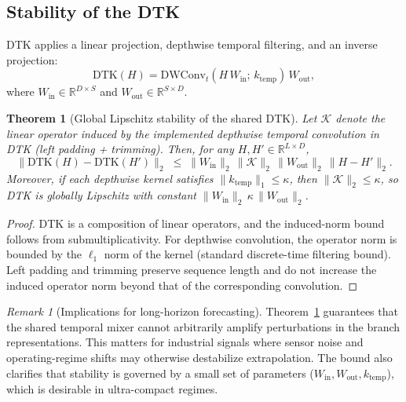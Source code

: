 \documentclass[journal]{IEEEtran}
\newtheorem{theorem}{Theorem}
\theoremstyle{remark}
\newtheorem{remark}{Remark}
\begin{document}
\subsection{Stability of the DTK}
DTK applies a linear projection, depthwise temporal filtering, and an
inverse projection:
\begin{equation}
\label{eq:dtk}
\mathrm{DTK}(H) = \mathrm{DWConv}_t(H\, W_{\mathrm{in}};\, k_{\mathrm{temp}})\,
                  W_{\mathrm{out}},
\end{equation}
where $W_{\mathrm{in}} \in \mathbb{R}^{D \times S}$ and
$W_{\mathrm{out}} \in \mathbb{R}^{S \times D}$.

\begin{theorem}[Global Lipschitz stability of the shared DTK]
\label{thm:dtk-lipschitz}
Let $\mathcal{K}$ denote the linear operator induced by the implemented
depthwise temporal convolution in DTK (left padding + trimming). Then,
for any $H, H' \in \mathbb{R}^{L \times D}$,
\begin{equation*}
\|\mathrm{DTK}(H) - \mathrm{DTK}(H')\|_2 \;\le\;
  \|W_{\mathrm{in}}\|_2 \, \|\mathcal{K}\|_2 \, \|W_{\mathrm{out}}\|_2 \,
  \|H - H'\|_2.
\end{equation*}
Moreover, if each depthwise kernel satisfies
$\|k_{\mathrm{temp}}\|_1 \le \kappa$, then
$\|\mathcal{K}\|_2 \le \kappa$, so DTK is globally Lipschitz with
constant $\|W_{\mathrm{in}}\|_2\, \kappa\, \|W_{\mathrm{out}}\|_2$.
\end{theorem}

\begin{proof}
DTK is a composition of linear operators, and the induced-norm bound
follows from submultiplicativity. For depthwise convolution, the
operator norm is bounded by the $\ell_1$ norm of the kernel (standard
discrete-time filtering bound). Left padding and trimming preserve
sequence length and do not increase the induced operator norm beyond
that of the corresponding convolution.
\end{proof}

\begin{remark}[Implications for long-horizon forecasting]
\label{rem:dtk-impl}
Theorem~\ref{thm:dtk-lipschitz} guarantees that the shared temporal
mixer cannot arbitrarily amplify perturbations in the branch
representations. This matters for industrial signals where sensor
noise and operating-regime shifts may otherwise destabilize
extrapolation. The bound also clarifies that stability is governed by a
small set of parameters
($W_{\mathrm{in}}, W_{\mathrm{out}}, k_{\mathrm{temp}}$), which is
desirable in ultra-compact regimes.
\end{remark}
\end{document}
